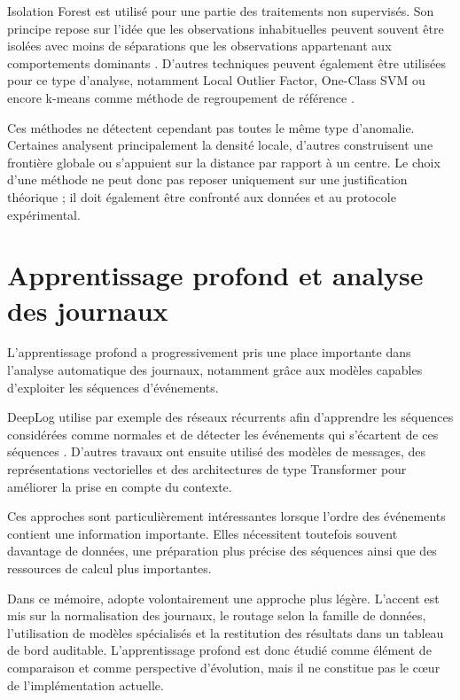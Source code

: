Isolation Forest est utilisé pour une partie des traitements non supervisés. Son principe repose sur l'idée que les observations inhabituelles peuvent souvent être isolées avec moins de séparations que les observations appartenant aux comportements dominants \cite{liu2008isolation}. D'autres techniques peuvent également être utilisées pour ce type d'analyse, notamment Local Outlier Factor, One-Class SVM ou encore k-means comme méthode de regroupement de référence \cite{breunig2000lof,scholkopf2001estimating,macqueen1967kmeans}.

Ces méthodes ne détectent cependant pas toutes le même type d'anomalie. Certaines analysent principalement la densité locale, d'autres construisent une frontière globale ou s'appuient sur la distance par rapport à un centre. Le choix d'une méthode ne peut donc pas reposer uniquement sur une justification théorique ; il doit également être confronté aux données et au protocole expérimental.

\section{Apprentissage profond et analyse des journaux}

L'apprentissage profond a progressivement pris une place importante dans l'analyse automatique des journaux, notamment grâce aux modèles capables d'exploiter les séquences d'événements.

DeepLog utilise par exemple des réseaux récurrents afin d'apprendre les séquences considérées comme normales et de détecter les événements qui s'écartent de ces séquences \cite{du2017deeplog}. D'autres travaux ont ensuite utilisé des modèles de messages, des représentations vectorielles et des architectures de type Transformer pour améliorer la prise en compte du contexte.

Ces approches sont particulièrement intéressantes lorsque l'ordre des événements contient une information importante. Elles nécessitent toutefois souvent davantage de données, une préparation plus précise des séquences ainsi que des ressources de calcul plus importantes.

Dans ce mémoire, \logminer{} adopte volontairement une approche plus légère. L'accent est mis sur la normalisation des journaux, le routage selon la famille de données, l'utilisation de modèles spécialisés et la restitution des résultats dans un tableau de bord auditable. L'apprentissage profond est donc étudié comme élément de comparaison et comme perspective d'évolution, mais il ne constitue pas le cœur de l'implémentation actuelle.

